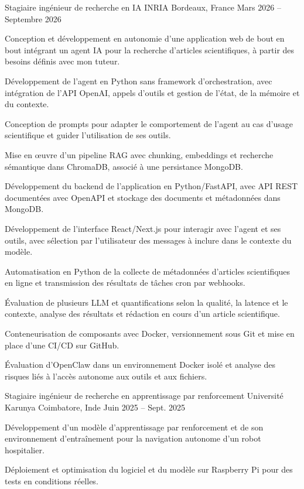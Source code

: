 
\begin{cventries}
  \cventry
    {Stagiaire ingénieur de recherche en IA}
    {INRIA}
    {Bordeaux, France}
    {Mars 2026 -- Septembre 2026}
    {
      \begin{cvitems}
        \item {Conception et développement en autonomie d’une application web de bout en bout intégrant un agent IA pour la recherche d’articles scientifiques, à partir des besoins définis avec mon tuteur.}
        \item {Développement de l’agent en Python sans framework d’orchestration, avec intégration de l’API OpenAI, appels d’outils et gestion de l’état, de la mémoire et du contexte.}
        \item {Conception de prompts pour adapter le comportement de l’agent au cas d’usage scientifique et guider l’utilisation de ses outils.}
        \item {Mise en œuvre d’un pipeline RAG avec chunking, embeddings et recherche sémantique dans ChromaDB, associé à une persistance MongoDB.}
        \item {Développement du backend de l’application en Python/FastAPI, avec API REST documentées avec OpenAPI et stockage des documents et métadonnées dans MongoDB.}
        \item {Développement de l’interface React/Next.js pour interagir avec l’agent et ses outils, avec sélection par l’utilisateur des messages à inclure dans le contexte du modèle.}
        \item {Automatisation en Python de la collecte de métadonnées d’articles scientifiques en ligne et transmission des résultats de tâches cron par webhooks.}
        \item {Évaluation de plusieurs LLM et quantifications selon la qualité, la latence et le contexte, analyse des résultats et rédaction en cours d’un article scientifique.}
        \item {Conteneurisation de composants avec Docker, versionnement sous Git et mise en place d’une CI/CD sur GitHub.}
        \item {Évaluation d’OpenClaw dans un environnement Docker isolé et analyse des risques liés à l’accès autonome aux outils et aux fichiers.}
      \end{cvitems}
    }

  \cventry
    {Stagiaire ingénieur de recherche en apprentissage par renforcement}
    {Université Karunya}
    {Coimbatore, Inde}
    {Juin 2025 -- Sept. 2025}
    {
      \begin{cvitems}
        \item {Développement d’un modèle d’apprentissage par renforcement et de son environnement d’entraînement pour la navigation autonome d’un robot hospitalier.}
        \item {Déploiement et optimisation du logiciel et du modèle sur Raspberry Pi pour des tests en conditions réelles.}
      \end{cvitems}
    }
\end{cventries}

